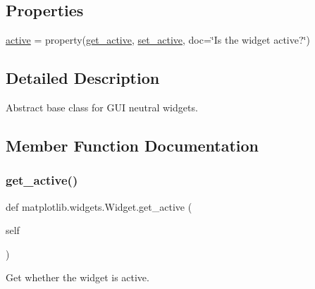 \subsection*{Properties}
\begin{DoxyCompactItemize}
\item 
\hyperlink{classmatplotlib_1_1widgets_1_1Widget_a6fc79b9a86770ee3a3b46ea419b7ad74}{active} = property(\hyperlink{classmatplotlib_1_1widgets_1_1Widget_a60f17f8bf5a5a5456e8956ff45d41051}{get\+\_\+active}, \hyperlink{classmatplotlib_1_1widgets_1_1Widget_a77e00e53e44f4b872499004051120f71}{set\+\_\+active}, doc=\char`\"{}Is the widget active?\char`\"{})
\end{DoxyCompactItemize}


\subsection{Detailed Description}
\begin{DoxyVerb}Abstract base class for GUI neutral widgets.
\end{DoxyVerb}
 

\subsection{Member Function Documentation}
\mbox{\label{classmatplotlib_1_1widgets_1_1Widget_a60f17f8bf5a5a5456e8956ff45d41051}} 
\subsubsection{\texorpdfstring{get\+\_\+active()}{get\_active()}}
{\footnotesize\ttfamily def matplotlib.\+widgets.\+Widget.\+get\+\_\+active (\begin{DoxyParamCaption}\item[{}]{self }\end{DoxyParamCaption})}

\begin{DoxyVerb}Get whether the widget is active.\end{DoxyVerb}
 \mbox{\label{classmatplotlib_1_1widgets_1_1Widget_a40f3557b670ca16e5102494417c85be1}} 
